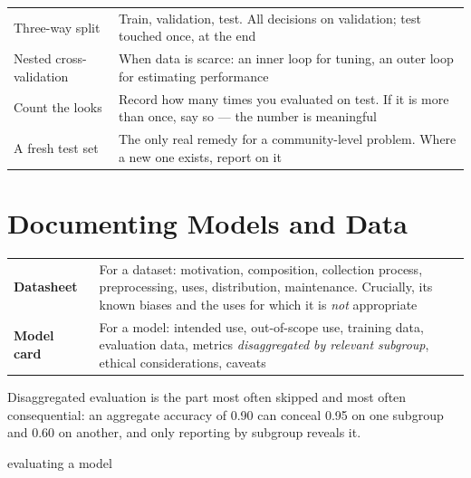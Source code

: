 \begin{center}
\small
\begin{tabular}{@{}L{3.6cm}L{10.7cm}@{}}
\toprule
Three-way split      & Train, validation, test. All decisions on validation;
                       test touched once, at the end \\
Nested cross-validation & When data is scarce: an inner loop for tuning, an
                       outer loop for estimating performance \\
Count the looks       & Record how many times you evaluated on test. If it is
                       more than once, say so --- the number is meaningful \\
A fresh test set      & The only real remedy for a community-level problem.
                       Where a new one exists, report on it \\
\bottomrule
\end{tabular}
\end{center}

\section{Documenting Models and Data}

\begin{center}
\small
\begin{tabular}{@{}L{3.2cm}L{11.1cm}@{}}
\textbf{Datasheet}~\cite{gebru2021datasheets}
  & For a dataset: motivation, composition, collection process, preprocessing,
    uses, distribution, maintenance. Crucially, its known biases and the uses
    for which it is \emph{not} appropriate \\
\textbf{Model card}~\cite{mitchell2019model}
  & For a model: intended use, out-of-scope use, training data, evaluation
    data, metrics \emph{disaggregated by relevant subgroup}, ethical
    considerations, caveats \\
\end{tabular}
\end{center}

Disaggregated evaluation is the part most often skipped and most often
consequential: an aggregate accuracy of 0.90 can conceal 0.95 on one subgroup
and 0.60 on another, and only reporting by subgroup reveals it.

\begin{traditions}{evaluating a model}
\end{traditions}

